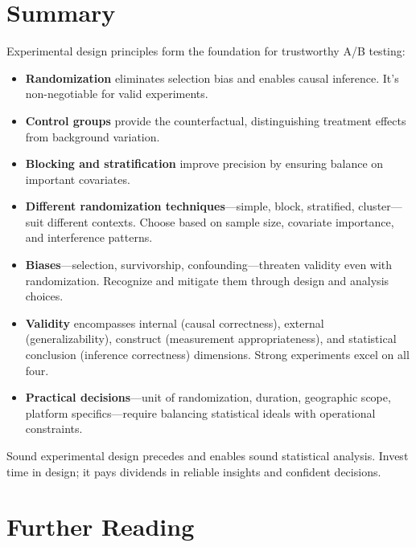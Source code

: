 \section{Summary}

Experimental design principles form the foundation for trustworthy A/B testing:

\begin{itemize}
    \item \textbf{Randomization} eliminates selection bias and enables causal inference. It's non-negotiable for valid experiments.

    \item \textbf{Control groups} provide the counterfactual, distinguishing treatment effects from background variation.

    \item \textbf{Blocking and stratification} improve precision by ensuring balance on important covariates.

    \item \textbf{Different randomization techniques}—simple, block, stratified, cluster—suit different contexts. Choose based on sample size, covariate importance, and interference patterns.

    \item \textbf{Biases}—selection, survivorship, confounding—threaten validity even with randomization. Recognize and mitigate them through design and analysis choices.

    \item \textbf{Validity} encompasses internal (causal correctness), external (generalizability), construct (measurement appropriateness), and statistical conclusion (inference correctness) dimensions. Strong experiments excel on all four.

    \item \textbf{Practical decisions}—unit of randomization, duration, geographic scope, platform specifics—require balancing statistical ideals with operational constraints.
\end{itemize}

Sound experimental design precedes and enables sound statistical analysis. Invest time in design; it pays dividends in reliable insights and confident decisions.

\section{Further Reading}

